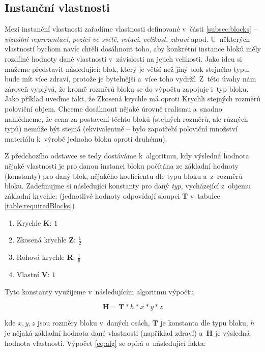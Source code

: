 \subsection{Instanční vlastnosti}
\label{subsec:instVlast}
Mezi instanční vlastnosti zařadíme vlastnosti definované v~části \ref{subsec:blocks} -- \textit{vizuální reprezentaci}, \textit{pozici ve světě}, \textit{rotaci}, \textit{velikost}, \textit{zdraví} apod. U~některých vlastností bychom navíc chtěli dosáhnout toho, aby konkrétní instance bloků měly rozdílné hodnoty dané vlastnosti v~závislosti na jejich velikosti. Jako ideu si můžeme představit následující: blok, který je větší než jiný blok stejného typu, bude mít více zdraví, protože je bytelnější a~více toho vydrží. Z~této úvahy nám zároveň vyplývá, že kromě rozměrů bloku se do výpočtu zapojuje i~typ bloku. Jako příklad uveďme fakt, že Zkosená krychle má oproti Krychli stejných rozměrů poloviční objem. Chceme dosáhnout nějaké úrovně realismu a~snadno nahlédneme, že cena za postavení těchto bloků (stejných rozměrů, ale různých typů) nemůže být stejná (ekvivalentně -- bylo zapotřebí poloviční množství materiálu k~výrobě jednoho bloku oproti druhému).

Z předchozího odstavce se tedy dostáváme k~algoritmu, kdy výsledná hodnota nějaké vlastnosti je pro danou instanci bloku počítána ze základní hodnoty (konstanty) pro daný blok, nějakého koeficientu dle typu bloku a~z~rozměrů bloku. Zadefinujme si následující konstanty pro daný \textit{typ}, vycházející z~objemu základní krychle: (jednotlivé hodnoty odpovídají sloupci \textbf{T} v~tabulce \ref{table:requiredBlocks})

\begin{enumerate}
	\item Krychle \textbf{K}: $1$
	\item Zkosená krychle \textbf{Z}: $\frac{1}{2}$
	\item Rohová krychle \textbf{R}: $\frac{1}{6}$
	\item Vlastní \textbf{V}: $1$
\end{enumerate}

Tyto konstanty využijeme v~následujícím algoritmu výpočtu

\begin{equation}\label{eq:alg}
	\bm H = \bm T * h * x * y * z
\end{equation}

kde $x, y, z$ jsou rozměry bloku v~daných osách, $\bm T$ je konstanta dle typu bloku, $h$ je nějaká základní hodnota dané vlastnosti (například zdraví) a~$\bm H$ je výsledná hodnota vlastnosti. Výpočet \ref{eq:alg} se opírá o~následující fakta:

